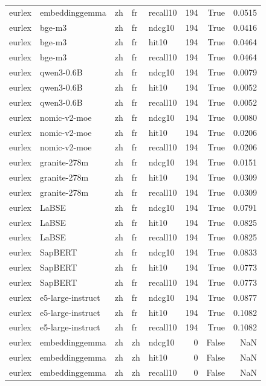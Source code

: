 \begin{tabular}{lllllrrr}
eurlex & embeddinggemma & zh & fr & recall10 & 194 & True & 0.0515 \\
eurlex & bge-m3 & zh & fr & ndcg10 & 194 & True & 0.0416 \\
eurlex & bge-m3 & zh & fr & hit10 & 194 & True & 0.0464 \\
eurlex & bge-m3 & zh & fr & recall10 & 194 & True & 0.0464 \\
eurlex & qwen3-0.6B & zh & fr & ndcg10 & 194 & True & 0.0079 \\
eurlex & qwen3-0.6B & zh & fr & hit10 & 194 & True & 0.0052 \\
eurlex & qwen3-0.6B & zh & fr & recall10 & 194 & True & 0.0052 \\
eurlex & nomic-v2-moe & zh & fr & ndcg10 & 194 & True & 0.0080 \\
eurlex & nomic-v2-moe & zh & fr & hit10 & 194 & True & 0.0206 \\
eurlex & nomic-v2-moe & zh & fr & recall10 & 194 & True & 0.0206 \\
eurlex & granite-278m & zh & fr & ndcg10 & 194 & True & 0.0151 \\
eurlex & granite-278m & zh & fr & hit10 & 194 & True & 0.0309 \\
eurlex & granite-278m & zh & fr & recall10 & 194 & True & 0.0309 \\
eurlex & LaBSE & zh & fr & ndcg10 & 194 & True & 0.0791 \\
eurlex & LaBSE & zh & fr & hit10 & 194 & True & 0.0825 \\
eurlex & LaBSE & zh & fr & recall10 & 194 & True & 0.0825 \\
eurlex & SapBERT & zh & fr & ndcg10 & 194 & True & 0.0833 \\
eurlex & SapBERT & zh & fr & hit10 & 194 & True & 0.0773 \\
eurlex & SapBERT & zh & fr & recall10 & 194 & True & 0.0773 \\
eurlex & e5-large-instruct & zh & fr & ndcg10 & 194 & True & 0.0877 \\
eurlex & e5-large-instruct & zh & fr & hit10 & 194 & True & 0.1082 \\
eurlex & e5-large-instruct & zh & fr & recall10 & 194 & True & 0.1082 \\
eurlex & embeddinggemma & zh & zh & ndcg10 & 0 & False & NaN \\
eurlex & embeddinggemma & zh & zh & hit10 & 0 & False & NaN \\
eurlex & embeddinggemma & zh & zh & recall10 & 0 & False & NaN \\

\end{tabular}
